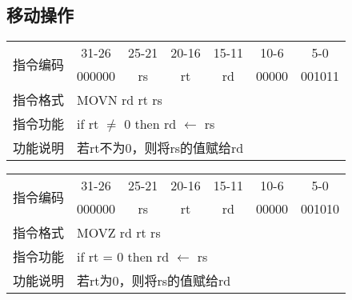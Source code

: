 \documentclass[a4paper,UTF8,fntef]{ctexart}
\begin{document}
\subsection{移动操作}
	\begin{table}[!hbp]
		\centering
		\begin{tabular}{|c|c|c|c|c|c|c|}
		\hline
		\multirow{2}{*}{指令编码} & 31-26&25-21 & 20-16&15-11 &10-6 &5-0\\
		\cline{2-7} & 000000 & rs & rt & rd & 00000& 001011 \\
		\hline
		指令格式&\multicolumn{6}{|l|}{MOVN rd rt rs}\\
		\hline		
		指令功能&\multicolumn{6}{|l|}{if rt $\neq$ 0 then rd $\leftarrow$ rs}\\
		\hline		
		功能说明&\multicolumn{6}{|l|}{若rt不为0，则将rs的值赋给rd}\\
		\hline
		\end{tabular}
	\end{table}
	\begin{table}[!hbp]
		\centering
		\begin{tabular}{|c|c|c|c|c|c|c|}
		\hline
		\multirow{2}{*}{指令编码} & 31-26&25-21 & 20-16&15-11 &10-6 &5-0\\
		\cline{2-7} & 000000 & rs & rt & rd & 00000& 001010 \\
		\hline
		指令格式&\multicolumn{6}{|l|}{MOVZ rd rt rs}\\
		\hline		
		指令功能&\multicolumn{6}{|l|}{if rt = 0 then rd $\leftarrow$ rs}\\
		\hline		
		功能说明&\multicolumn{6}{|l|}{若rt为0，则将rs的值赋给rd}\\
		\hline
		\end{tabular}
	\end{table}
\newpage
\end{document}
